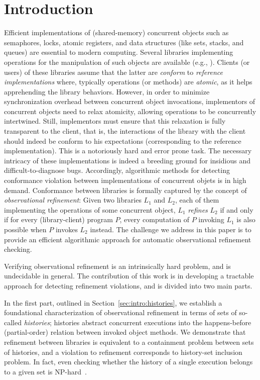 \section{Introduction}

Efficient implementations of (shared-memory) concurrent objects such as
semaphores, locks, atomic registers, and data structures (like sets, stacks,
and queues) are essential to modern computing. Several libraries implementing
operations for the manipulation of such objects are available (e.g., \cite{}).
Clients (or users) of these libraries assume that the latter are \emph{conform}
to \emph{reference implementations} where, typically operations (or methods) are
\emph{atomic}, as it helps apprehending the library behaviors. However, in order
to minimize synchronization overhead between concurrent object invocations,
implementors of concurrent objects need to relax atomicity, allowing operations
to be concurrently intertwined. Still, implementors must ensure that this
relaxation is fully transparent to the client, that is, the interactions of the
library with the client should indeed be conform to his expectations
(corresponding to the reference implementation). This is a notoriously hard and
error prone task. The necessary intricacy of these implementations is indeed a
breeding ground for insidious and difficult-to-diagnose bugs. Accordingly,
algorithmic methods for detecting conformance violation between implementations
of concurrent objets is in high demand. Conformance between libraries is
formally captured by the concept of \emph{observational refinement}: Given two
libraries $L_1$ and $L_2$, each of them implementing the operations of some
concurrent object, $L_1$ \emph{refines} $L_2$ if and only if for every
(library-client) program $P$, every computation of $P$ invoking $L_1$ is also
possible when $P$ invokes $L_2$ instead. The challenge we address in this paper is to provide an 
efficient algorithmic approach for automatic observational refinement checking.

Verifying observational refinement is an intrinsically hard problem, and is
undecidable in general. The contribution of this work is in developing a
tractable approach for detecting refinement violations, and is divided into two
main parts.

In the first part, outlined in Section~\ref{sec:intro:histories}, we establish
a foundational characterization of observational refinement in terms of sets of
so-called \emph{histories}; histories abstract concurrent executions into the
happens-before (partial-order) relation between invoked object methods. We
demonstrate that refinement between libraries is equivalent to a containment
problem between sets of histories, and a violation to refinement corresponds to
history-set inclusion problem. In fact, even checking whether the history of a
single execution belongs to a given set is
NP-hard~\cite{journals/siamcomp/GibbonsK97}.

